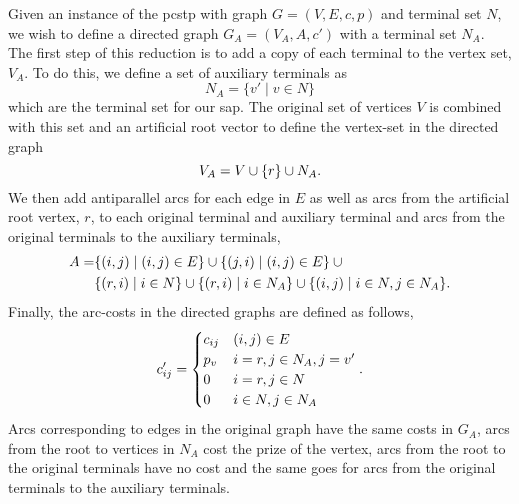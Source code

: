 Given an instance of the \gls{pcstp} with graph $G = (V,E,c,p)$ and terminal set $N$, we wish to define
 a directed graph $G_A = (V_A, A, c')$ with a terminal set $N_A$. The first
 step of this reduction is to add a copy of each terminal to the vertex set, $V_A$.
 To do this, we define a
set of auxiliary terminals as
\[N_A = \{v' \mid v \in N\}\]
which are the terminal set for our \gls{sap}.
The original set of vertices $V$ is combined with this set and an
artificial root vector to define the vertex-set in the directed graph
\[V_A = V \cup \{r\} \cup N_A\mathnormal{.}\]
We then add antiparallel arcs for each edge in $E$ as well as arcs from the artificial root vertex, $r$,
to each original terminal and auxiliary terminal and arcs from the original terminals to the auxiliary
terminals,
\begin{align*}
A = &\{(i,j) \mid (i,j) \in E \} \cup \{ (j,i) \mid (i,j) \in E \} \:\cup \\
&\{(r, i) \mid i \in N\} \cup \{(r,i) \mid i \in N_A\} \cup \{(i,j) \mid i \in N, j \in N_A\}\mathnormal{.}
\end{align*}
Finally, the arc-costs in the directed graphs are defined as follows,
$$c'_{ij} =
\begin{cases}
  c_{ij} & (i,j) \in E \\
  p_v & i = r, j \in N_A , j = v' \\
  0 & i = r, j \in N \\
  0 & i \in N, j \in N_A
\end{cases}\textnormal{.}$$
Arcs corresponding to edges in the original graph have the same costs in $G_A$, arcs from the root
to vertices in $N_A$ cost the prize of the vertex, arcs from the root to the original terminals
have no cost and the same goes for arcs from the original terminals to the auxiliary terminals.

